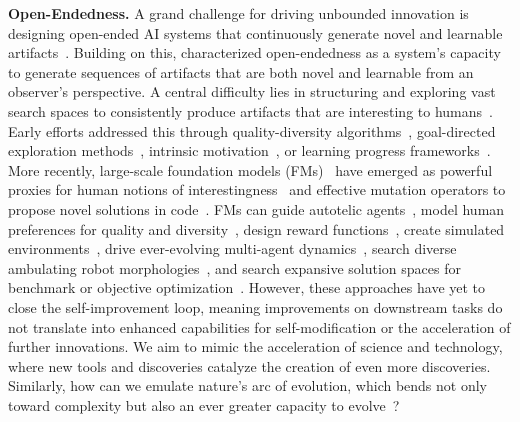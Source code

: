 \documentclass{article}
\begin{document}
\textbf{Open-Endedness.}
A grand challenge for driving unbounded innovation is designing open-ended AI systems that continuously generate novel and learnable artifacts~\citep{stanley2017open}. Building on this, \citet{hughes2024open} characterized open-endedness as a system's capacity to generate sequences of artifacts that are both novel and learnable from an observer's perspective. A central difficulty lies in structuring and exploring vast search spaces to consistently produce artifacts that are interesting to humans~\citep{clune2019ai, jiang2023general}. Early efforts addressed this through quality-diversity algorithms~\citep{pugh2016quality, chatzilygeroudis2021quality, mouret2015illuminating, nguyen2015innovation}, goal-directed exploration methods~\citep{ecoffet2019go, ecoffet2021first, schaul2015universal, andrychowicz2017hindsight, eysenbach2018diversity}, intrinsic motivation~\citep{lehman2011novelty, oudeyer2007intrinsic, li2014encouraging, pathak2017curiosity}, or learning progress frameworks~\citep{kanitscheider2021multi, gaven2025magellan, baranes2013active, colas2019curious, colas2022autotelic, jiang2021prioritized, dennis2020emergent, schmidhuber2008driven, schmidhuber2013powerplay}. More recently, large-scale foundation models (FMs)~\citep{brown2020language, radford2019language} have emerged as powerful proxies for human notions of interestingness~\citep{zhang2024omni,faldor2025omni,sancaktar2025sensei} and effective mutation operators to propose novel solutions in code~\citep{romera2024mathematical,Novikov2025AlphaEvolve,lehman2023evolution,faldor2025omni,hu2025automated}. FMs can guide autotelic agents~\citep{colas2022autotelic, colas2023augmenting, colas2022language}, model human preferences for quality and diversity~\citep{bradley2023quality, ding2023quality, wang2023diversity, klissarov2023motif, klissarov2024maestromotif, samvelyan2024rainbow, lim2024large, havrilla2024surveying}, design reward functions~\citep{wang2023voyager, ma2023eureka, faldor2025omni}, create simulated environments~\citep{sudhakaran2023mariogpt, nasir2023practical, aki2024llm, nasir2024word2world, bruce2024genie, parkerholder2024genie2}, drive ever-evolving multi-agent dynamics~\citep{dharna2024quality, zhou2025autoredteamer}, search diverse ambulating robot morphologies~\citep{lehman2023evolution}, and search expansive solution spaces for benchmark or objective optimization~\citep{lange2024large, zhang2024omni, faldor2025omni, hu2025automated, lu2024intelligent, romera2024mathematical, fernandopromptbreeder, lu2024ai, khan2024debating, lu2025automated, liu2024evolution, Novikov2025AlphaEvolve}. However, these approaches have yet to close the self-improvement loop, meaning improvements on downstream tasks do not translate into enhanced capabilities for self-modification or the acceleration of further innovations. We aim to mimic the acceleration of science and technology, where new tools and discoveries catalyze the creation of even more discoveries. Similarly, how can we emulate nature's arc of evolution, which bends not only toward complexity but also an ever greater capacity to evolve~\citep{dawkins2019evolution, gerhart2007theory, hendrikse2007evolvability}?
\end{document}
